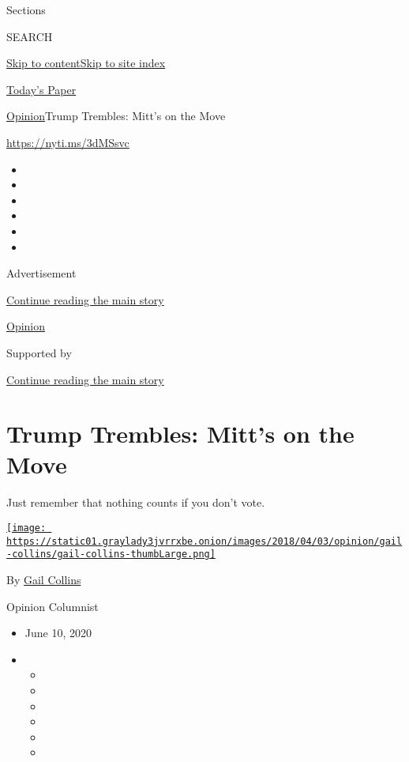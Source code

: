 Sections

SEARCH

\protect\hyperlink{site-content}{Skip to
content}\protect\hyperlink{site-index}{Skip to site index}

\href{https://myaccount.nytimes3xbfgragh.onion/auth/login?response_type=cookie\&client_id=vi}{}

\href{https://www.nytimes3xbfgragh.onion/section/todayspaper}{Today's
Paper}

\href{/section/opinion}{Opinion}\textbar{}Trump Trembles: Mitt's on the
Move

\url{https://nyti.ms/3dMSsvc}

\begin{itemize}
\item
\item
\item
\item
\item
\item
\end{itemize}

Advertisement

\protect\hyperlink{after-top}{Continue reading the main story}

\href{/section/opinion}{Opinion}

Supported by

\protect\hyperlink{after-sponsor}{Continue reading the main story}

\hypertarget{trump-trembles-mitts-on-the-move}{%
\section{Trump Trembles: Mitt's on the
Move}\label{trump-trembles-mitts-on-the-move}}

Just remember that nothing counts if you don't vote.

\href{https://www.nytimes3xbfgragh.onion/by/gail-collins}{\texttt{[image: https://static01.graylady3jvrrxbe.onion/images/2018/04/03/opinion/gail-collins/gail-collins-thumbLarge.png]}}

By \href{https://www.nytimes3xbfgragh.onion/by/gail-collins}{Gail
Collins}

Opinion Columnist

\begin{itemize}
\item
  June 10, 2020
\item
  \begin{itemize}
  \item
  \item
  \item
  \item
  \item
  \item
  \end{itemize}
\end{itemize}

